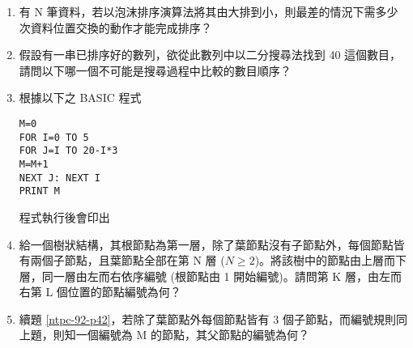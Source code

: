 \documentclass[12pt,a4paper]{report}
\begin{document}
\begin{CJK}{UTF8}{bkai}
\begin{enumerate}
\item 有 N 筆資料，若以泡沫排序演算法將其由大排到小，則最差的情況下需多少次資料位置交換的動作才能完成排序？
\item 假設有一串已排序好的數列，欲從此數列中以二分搜尋法找到 40 這個數目，請問以下哪一個不可能是搜尋過程中比較的數目順序？
\item 根據以下之 BASIC 程式
  \begin{lstlisting}[language={[Visual]Basic}]
M=0
FOR I=0 TO 5
FOR J=I TO 20-I*3
M=M+1
NEXT J: NEXT I
PRINT M
  \end{lstlisting}
  程式執行後會印出
\item \label{ntpc-92-p42} 給一個樹狀結構，其根節點為第一層，除了葉節點沒有子節點外，每個節點皆有兩個子節點，且葉節點全部在第 N 層 ($N\geq{2}$)。將該樹中的節點由上層而下層，同一層由左而右依序編號 (根節點由 1 開始編號)。請問第 K 層，由左而右第 L 個位置的節點編號為何？
\item \label{ntpc-92-p43} 續題 \ref{ntpc-92-p42}，若除了葉節點外每個節點皆有 3 個子節點，而編號規則同上題，則知一個編號為 M 的節點，其父節點的編號為何？

\end{enumerate}
\end{CJK}
\end{document}
